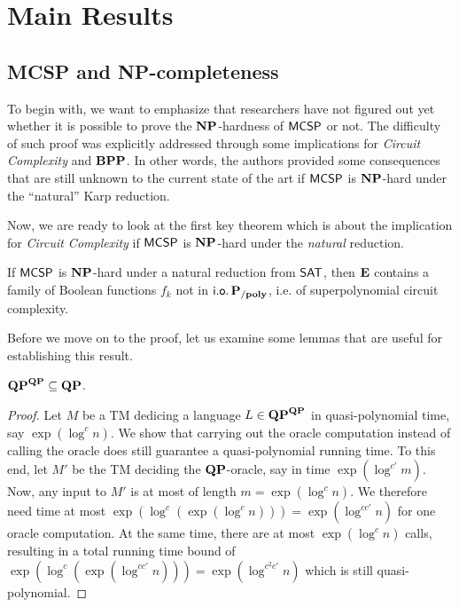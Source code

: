 \documentclass[11pt]{article}
\begin{document}
\section{Main Results}

\subsection{MCSP and NP-completeness}

To begin with, we want to emphasize that researchers have not figured out yet whether it is possible to prove the $\mathbf{NP}$-hardness of $\mathsf{MCSP}$ or not. The difficulty of such proof was explicitly addressed through some implications for \textit{Circuit Complexity} and $\mathbf{BPP}$. In other words, the authors provided some consequences that are still unknown to the current state of the art if $\mathsf{MCSP}$ is $\mathbf{NP}$-hard under the ``natural'' Karp reduction. 

Now, we are ready to look at the first key theorem which is about the implication for \textit{Circuit Complexity} if $\mathsf{MCSP}$ is $\mathbf{NP}$-hard under the \textit{natural} reduction.

\begin{theorem}[\cite{10.1145/335305.335314}]
  \label{thm:15-1}
  If $\mathsf{MCSP}$ is $\mathbf{NP}$-hard under a natural reduction from
  $\mathsf{SAT}$, then $\mathbf{E}$ contains a family of Boolean functions
  $f_k$ not in $\mathsf{i.o.}\, \mathbf{P_{/poly}}$, i.e. of superpolynomial circuit complexity.
\end{theorem}

Before we move on to the proof, let us examine some lemmas that are useful
for establishing this result.

\begin{lemma}
	\label{lem:qp-collapse}
	$\mathbf{QP}^{\mathbf{QP}} \subseteq \mathbf{QP}$.
\end{lemma}

\begin{proof}
  Let $M$ be a TM dedicing a language $L \in \mathbf{QP}^{\mathbf{QP}}$ in
  quasi-polynomial time, say $\exp(\log^c n)$.
  We show that carrying out the oracle computation instead of calling the
  oracle does still guarantee a quasi-polynomial running time. To this end,
  let $M'$ be the TM deciding the $\mathbf{QP}$-oracle, say in time
  $\exp(\log^{c'} m)$.
  Now, any input to $M'$ is at most of length $m = \exp(\log^c n)$. We
  therefore need time at most
  $\exp(\log^c (\exp(\log^c n))) = \exp(\log^{cc'} n)$
  for one oracle computation. At the same time, there are at most
  $\exp(\log^c n)$ calls, resulting in a total running time bound of
  $\exp(\log^c (\exp(\log^{cc'} n))) = \exp(\log^{c^2 c'} n)$
  which is still quasi-polynomial.
\end{proof}
\end{document}
